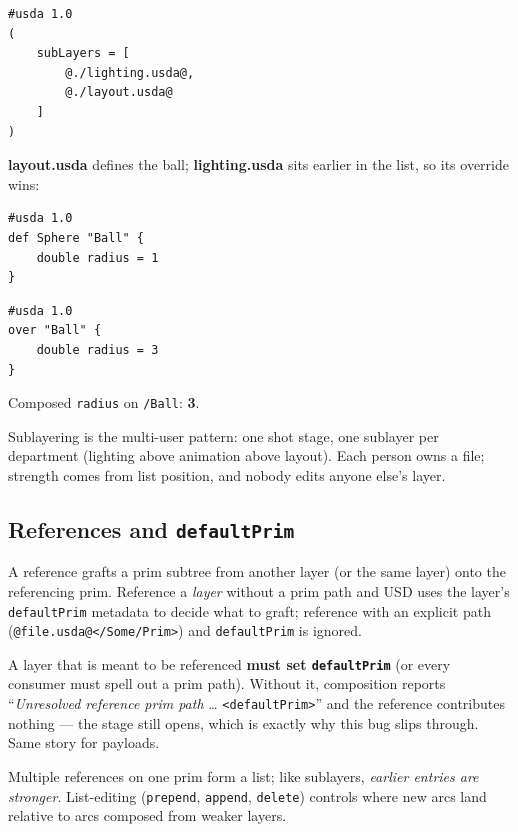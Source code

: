 \begin{lstlisting}
#usda 1.0
(
    subLayers = [
        @./lighting.usda@,
        @./layout.usda@
    ]
)
\end{lstlisting}

\noindent\textbf{layout.usda} defines the ball; \textbf{lighting.usda} sits
earlier in the list, so its override wins:

\begin{lstlisting}
#usda 1.0
def Sphere "Ball" {
    double radius = 1
}
\end{lstlisting}

\begin{lstlisting}
#usda 1.0
over "Ball" {
    double radius = 3
}
\end{lstlisting}

\noindent Composed \texttt{radius} on \texttt{/Ball}: \textbf{3}.

\begin{ExamTip}
Sublayering is the multi-user pattern: one shot stage, one sublayer per
department (lighting above animation above layout). Each person owns a file;
strength comes from list position, and nobody edits anyone else's layer.
\end{ExamTip}

\subsection{References and \texttt{defaultPrim}}\label{sec:c-refs}
A reference grafts a prim subtree from
another layer (or the same layer) onto the referencing prim. Reference a
\emph{layer} without a prim path and USD uses the layer's
\texttt{defaultPrim} metadata to decide what to graft; reference with an
explicit path (\texttt{@file.usda@</Some/Prim>}) and \texttt{defaultPrim} is
ignored.

\begin{Gotcha}
A layer that is meant to be referenced \textbf{must set \texttt{defaultPrim}}
(or every consumer must spell out a prim path). Without it, composition
reports ``\emph{Unresolved reference prim path} \ldots
\texttt{<defaultPrim>}'' and the reference contributes nothing --- the stage
still opens, which is exactly why this bug slips through. Same story for
payloads.
\end{Gotcha}

Multiple references on one prim form a list; like sublayers, \emph{earlier
entries are stronger}. List-editing (\texttt{prepend}, \texttt{append},
\texttt{delete}) controls where new arcs land relative to arcs composed from
weaker layers.

